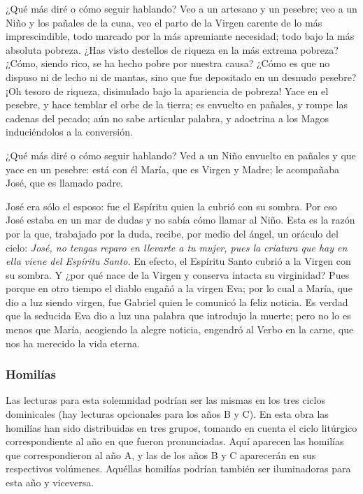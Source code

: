 \documentclass[]{article}
\begin{document}
¿Qué más diré o cómo seguir hablando? Veo a un artesano y un pesebre;
veo a un Niño y los pañales de la cuna, veo el parto de la Virgen
carente de lo más imprescindible, todo marcado por la más apremiante
necesidad; todo bajo la más absoluta pobreza. ¿Has visto destellos de
riqueza en la más extrema pobreza? ¿Cómo, siendo rico, se ha hecho pobre
por nuestra causa? ¿Cómo es que no dispuso ni de lecho ni de mantas,
sino que fue depositado en un desnudo pesebre? ¡Oh tesoro de riqueza,
disimulado bajo la apariencia de pobreza! Yace en el pesebre, y hace
temblar el orbe de la tierra; es envuelto en pañales, y rompe las
cadenas del pecado; aún no sabe articular palabra, y adoctrina a los
Magos induciéndolos a la conversión.

¿Qué más diré o cómo seguir hablando? Ved a un Niño envuelto en pañales
y que yace en un pesebre: está con él María, que es Virgen y Madre; le
acompañaba José, que es llamado padre.

José era sólo el esposo: fue el Espíritu quien la cubrió con su sombra.
Por eso José estaba en un mar de dudas y no sabía cómo llamar al Niño.
Esta es la razón por la que, trabajado por la duda, recibe, por medio
del ángel, un oráculo del cielo: \emph{José, no tengas reparo en
llevarte a tu mujer, pues la criatura que hay en ella viene del Espíritu
Santo.} En efecto, el Espíritu Santo cubrió a la Virgen con su sombra. Y
¿por qué nace de la Virgen y conserva intacta su virginidad? Pues porque
en otro tiempo el diablo engañó a la virgen Eva; por lo cual a María,
que dio a luz siendo virgen, fue Gabriel quien le comunicó la feliz
noticia. Es verdad que la seducida Eva dio a luz una palabra que
introdujo la muerte; pero no lo es menos que María, acogiendo la alegre
noticia, engendró al Verbo en la carne, que nos ha merecido la vida
eterna.\protect\hypertarget{_Toc448662812}{}{\protect\hypertarget{_Toc448690331}{}{}}

\subsubsection{Homilías}\label{homiluxedas-8}

Las lecturas para esta solemnidad podrían ser las mismas en los tres
ciclos dominicales (hay lecturas opcionales para los años B y C). En
esta obra las homilías han sido distribuidas en tres grupos, tomando en
cuenta el ciclo litúrgico correspondiente al año en que fueron
pronunciadas. Aquí aparecen las homilías que correspondieron al año A, y
las de los años B y C aparecerán en sus respectivos volúmenes. Aquéllas
homilías podrían también ser iluminadoras para esta año y viceversa.
\end{document}
